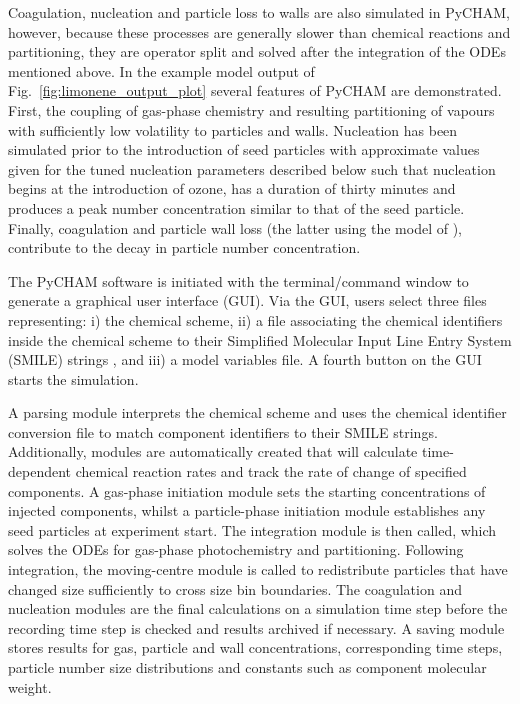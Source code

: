 \documentclass[gmd, manuscript]{copernicus}
\begin{document}
Coagulation, nucleation and particle loss to walls are also simulated in PyCHAM, however, because these processes are generally slower than chemical reactions and partitioning, they are operator split and solved after the integration of the ODEs mentioned above.  In the example model output of Fig.~\ref{fig:limonene_output_plot} several features of PyCHAM are demonstrated.  First, the coupling of gas-phase chemistry and resulting partitioning of vapours with sufficiently low volatility to particles and walls.  Nucleation has been simulated prior to the introduction of seed particles with approximate values given for the tuned nucleation parameters described below such that nucleation begins at the introduction of ozone, has a duration of thirty minutes and produces a peak number concentration similar to that of the seed particle.  Finally, coagulation and particle wall loss (the latter using the model of \citet{McMurry1985}), contribute to the decay in particle number concentration.

The PyCHAM software is initiated with the terminal/command window to generate a graphical user interface (GUI).  Via the GUI, users select three files  representing: i) the chemical scheme, ii) a file associating the chemical identifiers inside the chemical scheme to their Simplified Molecular Input Line Entry System (SMILE) strings \citep{Weininger1988}, and iii) a model variables file.  A fourth button on the GUI starts the simulation.

A parsing module interprets the chemical scheme and uses the chemical identifier conversion file to match component identifiers to their SMILE strings.  Additionally, modules are automatically created that will calculate time-dependent chemical reaction rates and track the rate of change of specified components.  A gas-phase initiation module sets the starting concentrations of injected components, whilst a particle-phase initiation module establishes any seed particles at experiment start.  The integration module is then called, which solves the ODEs for gas-phase photochemistry and partitioning.  Following integration, the moving-centre module is called to redistribute particles that have changed size sufficiently to cross size bin boundaries.  The coagulation and nucleation modules are the final calculations on a simulation time step before the recording time step is checked and results archived if necessary.  A saving module stores results for gas, particle and wall concentrations, corresponding time steps, particle number size distributions and constants such as component molecular weight.
\end{document}
